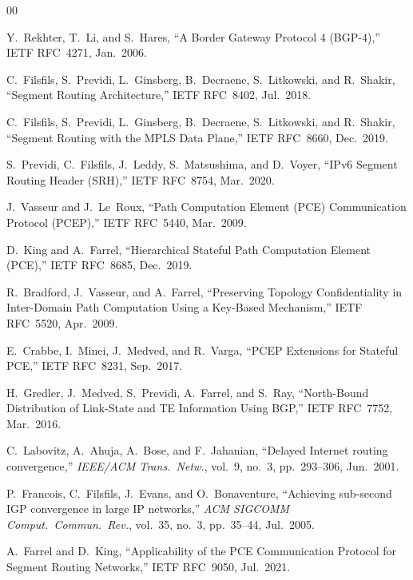\documentclass[conference]{IEEEtran}
\begin{document}
\begin{thebibliography}{00}

Y.~Rekhter, T.~Li, and S.~Hares,
``A Border Gateway Protocol 4 (BGP-4),''
IETF RFC~4271, Jan.\ 2006.

C.~Filsfils, S.~Previdi, L.~Ginsberg, B.~Decraene, S.~Litkowski,
and R.~Shakir,
``Segment Routing Architecture,''
IETF RFC~8402, Jul.\ 2018.

C.~Filsfils, S.~Previdi, L.~Ginsberg, B.~Decraene, S.~Litkowski,
and R.~Shakir,
``Segment Routing with the MPLS Data Plane,''
IETF RFC~8660, Dec.\ 2019.

S.~Previdi, C.~Filsfils, J.~Leddy, S.~Matsushima, and D.~Voyer,
``IPv6 Segment Routing Header (SRH),''
IETF RFC~8754, Mar.\ 2020.

J.~Vasseur and J.~Le~Roux,
``Path Computation Element (PCE) Communication Protocol (PCEP),''
IETF RFC~5440, Mar.\ 2009.

D.~King and A.~Farrel,
``Hierarchical Stateful Path Computation Element (PCE),''
IETF RFC~8685, Dec.\ 2019.

R.~Bradford, J.~Vasseur, and A.~Farrel,
``Preserving Topology Confidentiality in Inter-Domain Path Computation
Using a Key-Based Mechanism,''
IETF RFC~5520, Apr.\ 2009.

E.~Crabbe, I.~Minei, J.~Medved, and R.~Varga,
``PCEP Extensions for Stateful PCE,''
IETF RFC~8231, Sep.\ 2017.

H.~Gredler, J.~Medved, S.~Previdi, A.~Farrel, and S.~Ray,
``North-Bound Distribution of Link-State and TE Information Using BGP,''
IETF RFC~7752, Mar.\ 2016.

C.~Labovitz, A.~Ahuja, A.~Bose, and F.~Jahanian,
``Delayed Internet routing convergence,''
\textit{IEEE/ACM Trans.\ Netw.}, vol.~9, no.~3, pp.~293--306,
Jun.\ 2001.

P.~Francois, C.~Filsfils, J.~Evans, and O.~Bonaventure,
``Achieving sub-second IGP convergence in large IP networks,''
\textit{ACM SIGCOMM Comput.\ Commun.\ Rev.}, vol.~35, no.~3,
pp.~35--44, Jul.\ 2005.

A.~Farrel and D.~King,
``Applicability of the PCE Communication Protocol for Segment
Routing Networks,''
IETF RFC~9050, Jul.\ 2021.


\end{thebibliography}
\end{document}
